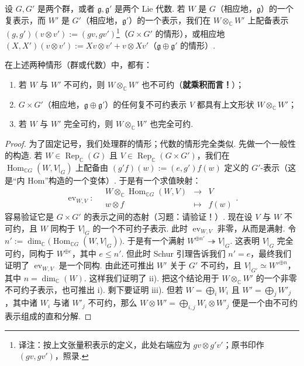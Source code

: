 \begin{numpara}[乘积的表示]\label{np:lie-1-12-9}
设 $G,G'$ 是两个群，或者 $\mathfrak g,\mathfrak g'$ 是两个 Lie 代数. 若 $W$ 是 $G$（相应地，$\mathfrak g$）的一个复表示，而 $W'$ 是 $G'$（相应地，$\mathfrak g'$）的一个表示，我们在 $W\otimes_{\mathbb C}W'$ 上配备表示 $(g,g')(v\otimes v'):=(gv,gv')$\footnote{译注：按上文张量积表示的定义，此处右端应为 $gv\otimes g'v'$；原书印作 $(gv,gv')$，照录.}（$G\times G'$ 的情形），或相应地 $(X,X')(v\otimes v'):=Xv\otimes v'+v\otimes Xv'$（$\mathfrak g\oplus\mathfrak g'$ 的情形）.
\begin{proposition*}
在上述两种情形（群或代数）中，都有：
\begin{enumerate}[label=\roman*)]
\item 若 $W$ 与 $W'$ 不可约，则 $W\otimes_{\mathbb C}W'$ 也不可约（\textbf{就乘积而言！}）；
\item $G\times G'$（相应地，$\mathfrak g\oplus\mathfrak g'$）的任何复不可约表示 $V$ 都具有上文形状 $W\otimes_{\mathbb C}W'$；
\item 若 $W$ 与 $W'$ 完全可约，则 $W\otimes_{\mathbb C}W'$ 也完全可约.
\end{enumerate}
\end{proposition*}
\begin{proof}
为了固定记号，我们处理群的情形；代数的情形完全类似. 先做一个一般性的构造. 若 $W\in\operatorname{Rep}_{\mathbb C}(G)$ 且 $V\in\operatorname{Rep}_{\mathbb C}(G\times G')$，我们在 $\operatorname{Hom}_{\mathbb C G}(W,V|_{G})$ 上配备由 $(g'f)(w):=(e,g')f(w)$ 定义的 $G'$-表示（这是``内 Hom''构造的一个变体）. 于是有一个求值映射：
\[
\operatorname{ev}_{W,V}:\quad
\begin{array}{rcl}
W\otimes_{\mathbb C}\operatorname{Hom}_{\mathbb C G}(W,V) & \longrightarrow & V\\
w\otimes f & \longmapsto & f(w)
\end{array}.
\]
容易验证它是 $G\times G'$ 的表示之间的态射（习题：请验证！）.
现在设 $V$ 与 $W$ 不可约，且 $W$ 同构于 $V|_{G}$ 的一个不可约子表示. 此时 $\operatorname{ev}_{W,V}$ 非零，从而是满射. 令 $n':=\dim_{\mathbb C}\bigl(\operatorname{Hom}_{\mathbb C G}(W,V|_{G})\bigr)$. 于是有一个满射 $W^{\oplus n'}\twoheadrightarrow V|_{G}$. 这表明 $V|_{G}$ 完全可约，同构于 $W^{\oplus e}$，其中 $e\leqslant n'$. 但此时 Schur 引理告诉我们 $n'=e$，最终我们证明了 $\operatorname{ev}_{W,V}$ 是一个同构. 由此还可推出 $W'$ 关于 $G'$ 不可约，且 $V|_{G'}\simeq W'^{\oplus n}$，其中 $n=\dim_{\mathbb C}(W)$.
这样我们证明了 ii). 把这个结论用于 $W\otimes_{\mathbb C}W'$ 的一个非零不可约子表示，也可推出 i).
剩下要证明 iii). 但若 $W=\bigoplus_{i}W_{i}$ 且 $W'=\bigoplus_{j}W'_{j}$，其中诸 $W_{i}$ 与诸 $W'_{j}$ 不可约，那么 $W\otimes W'=\bigoplus_{i,j}W_{i}\otimes W'_{j}$ 便是一个由不可约表示组成的直和分解.
\end{proof}
\end{numpara}

